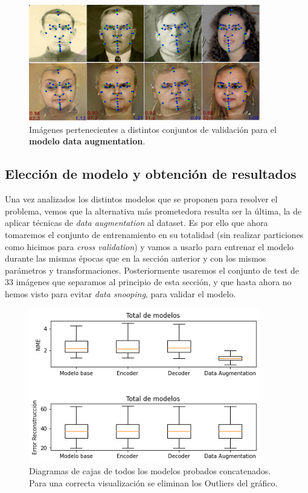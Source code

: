        \begin{figure}[H]
            \centering
            \includegraphics[width=0.9\textwidth]{img/image_daug.png}
            \caption{Imágenes pertenecientes a distintos conjuntos de validación para el \textbf{modelo data augmentation}.}
            \label{fig:Ejemplo_daug}
        \end{figure}

    \subsection{Elección de modelo y obtención de resultados}

        \noindent Una vez analizados los distintos modelos que se proponen para resolver el problema, vemos que la alternativa más prometedora resulta ser la última, la de aplicar técnicas de \textit{data augmentation} al dataset. Es por ello que ahora tomaremos el conjunto de entrenamiento en su totalidad (sin realizar particiones como hicimos para \textit{cross validation}) y vamos a usarlo para entrenar el modelo durante las mismas épocas que en la sección anterior y con los mismos parámetros y transformaciones. Posteriormente usaremos el conjunto de test de $33$ imágenes que separamos al principio de esta sección, y que hasta ahora no hemos visto para evitar \textit{data snooping}, para validar el modelo.

        \begin{figure}[H]
            \centering
            \includegraphics[width=0.9\textwidth]{img/boxplot_sumarize.png}
            \caption{Diagramas de cajas de todos los modelos probados concatenados. Para una correcta visualización se eliminan los Outliers del gráfico.}
            \label{fig:boxplot_summary}
        \end{figure}


